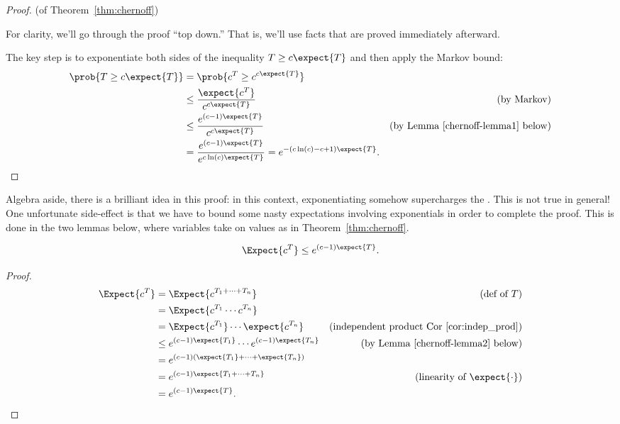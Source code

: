 \begin{proof} (of Theorem~\ref{thm:chernoff})

For clarity, we'll go through the proof ``top down.''  That is, we'll
use facts that are proved immediately afterward.

The key step is to exponentiate both sides of the inequality $T \ge c
\expect{T}$ and then apply the Markov bound:
\begingroup
\openup\jot
\begin{align*}
\prob{T \geq c \expect{T}} & = \prob{c^T \geq c^{c \expect{T}}} \\
  & \leq \frac{\expect{c^T}}{c^{c \expect{T}}} & \text{(by Markov)}\\
  & \leq \frac{e^{(c-1) \expect{T}}}{c^{c \expect{T}}}
         & \text{(by Lemma~\ref{chernoff-lemma1} below)}\\
  & = \frac{e^{(c-1) \expect{T}}}{e^{c \ln(c) \expect{T}}} = e^{- (c \ln(c) - c + 1) \expect{T}}.
\end{align*}
\endgroup
\end{proof}

Algebra aside, there is a brilliant idea in this proof: in this
context, exponentiating somehow supercharges the .
This is not true in general!  One unfortunate side-effect is that we
have to bound some nasty expectations involving exponentials in order
to complete the proof.  This is done in the two lemmas below, where
variables take on values as in Theorem~\ref{thm:chernoff}.

\begin{lemma}\label{chernoff-lemma1}
\[
    \Expect{c^T} \leq e^{(c-1) \expect{T}}.
\]
\end{lemma}

\begin{proof}
\begin{align*}
    \Expect{c^T} & = \Expect{c^{T_1 + \cdots + T_n}}
                 & \text{(def of $T$)}\\
            & = \Expect{c^{T_1} \cdots c^{T_n}} \\
            & = \Expect{c^{T_1}}  \cdots \expect{c^{T_n}}
                 & \text{(independent product Cor~\ref{cor:indep_prod})}\\
            & \leq e^{(c-1) \expect{T_1}} \cdots  e^{(c-1) \expect{T_n}}
               & \text{(by Lemma~\ref{chernoff-lemma2} below)}\\
            & = e^{(c-1) (\expect{T_1} + \cdots + \expect{T_n})} \\
            & = e^{(c-1) \expect{T_1 + \cdots + T_n}}
                   & \text{(linearity of $\expect{\cdot}$)}\\
            & = e^{(c-1) \expect{T}}.
\end{align*}
\end{proof}

